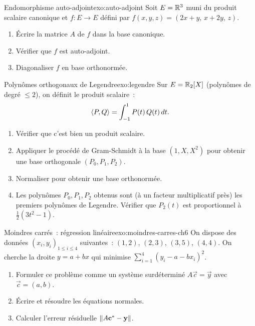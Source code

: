 \begin{exercise}{\intermediate{} Endomorphisme auto-adjoint}{exo:auto-adjoint}
  Soit $E={\mathbb{R}}^3$ muni du produit scalaire canonique et
  $f\colon E\to E$ défini par $f(x,y,z)=(2x+y,\,x+2y,\,z)$.
  \begin{enumerate}[label=(\alph*)]
    \item Écrire la matrice $A$ de $f$ dans la base canonique.
    \item Vérifier que $f$ est auto-adjoint.
    \item Diagonaliser $f$ en base orthonormée.
  \end{enumerate}
\end{exercise}

\begin{exercise}{\challenging{} Polynômes orthogonaux de Legendre}{exo:legendre}
  Sur $E={\mathbb{R}}_2[X]$ (polynômes de degré $\leq 2$), on définit le produit
  scalaire~:
  \[
    \langle P,Q\rangle=\int_{-1}^1 P(t)\,Q(t)\,dt.
  \]
  \begin{enumerate}[label=(\alph*)]
    \item Vérifier que c'est bien un produit scalaire.
    \item Appliquer le procédé de Gram-Schmidt à la base $(1,X,X^2)$
      pour obtenir une base orthogonale $(P_0,P_1,P_2)$.
    \item Normaliser pour obtenir une base orthonormée.
    \item Les polynômes $P_0,P_1,P_2$ obtenus sont (à un facteur
      multiplicatif près) les premiers polynômes de Legendre. Vérifier
      que $P_2(t)$ est proportionnel à $\frac{1}{2}(3t^2-1)$.
  \end{enumerate}
\end{exercise}

\begin{exercise}{\challenging{} Moindres carrés~: régression linéaire}{exo:moindres-carres-ch6}
  On dispose des données $(x_i,y_i)_{1\leq i\leq 4}$ suivantes~:
  $(1,2)$, $(2,3)$, $(3,5)$, $(4,4)$.
  On cherche la droite $y=a+bx$ qui minimise
  $\sum_{i=1}^4(y_i-a-bx_i)^2$.
  \begin{enumerate}[label=(\alph*)]
    \item Formuler ce problème comme un système surdéterminé
      $A\vec{c}=\vec{y}$ avec $\vec{c}=(a,b)$.
    \item Écrire et résoudre les équations normales.
    \item Calculer l'erreur résiduelle
      $\lVert A\mathbf{c}^*-\mathbf{y}\rVert$.
  \end{enumerate}
\end{exercise}

